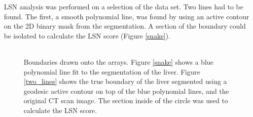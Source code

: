 \documentclass[12pt]{article}
\begin{document}
\color{black}
LSN analysis was performed on a selection of the data set. Two lines had to be found. The first, a smooth polynomial line, was found by using an active contour on the 2D binary mask from the segmentation. A section of the boundary could be isolated to calculate the LSN score (Figure \ref{snake}). 
\\ \\
\begin{figure}[h!!]
  \centering
  \hspace{1em}
  \caption{Boundaries drawn onto the arrays. Figure \ref{snake} shows a blue polynomial line fit to the segmentation of the liver. Figure \ref{two_lines} shows the true boundary of the liver segmented using a geodesic active contour on top of the blue polynomial lines, and the original CT scan image. The section inside of the circle was used to calculate the LSN score.}
  \label{boundaries}
\end{figure}
\end{document}
